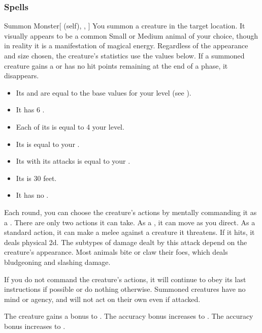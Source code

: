 \subsubsection{Spells}


\lowercase{\hypertarget{spell:Summon Monster}{}}\label{spell:Summon Monster}
\begin{attuneability}[Rank 1]{\hypertarget{spell:Summon Monster}{Summon Monster}}[ (self), , ]
You summon a creature in the target location.
It visually appears to be a common Small or Medium animal of your choice, though in reality it is a manifestation of magical energy.
Regardless of the appearance and size chosen, the creature's statistics use the values below.
If a summoned creature gains a  or has no hit points remaining at the end of a phase, it disappears.

\begin{itemize}
\item Its  and  are equal to the base values for your level (see ).
\item It has 6 .
\item Each of its  is equal to 4 \add your level.
\item Its  is equal to your  .
\item Its  with its attacks is equal to your .
\item Its  is 30 feet.
\item It has no .
\end{itemize}

Each round, you can choose the creature's actions by mentally commanding it as a .
There are only two actions it can take.
As a , it can move as you direct.
As a standard action, it can make a melee  against a creature it threatens.
If it hits, it deals physical  \minus2d.
The subtypes of damage dealt by this attack depend on the creature's appearance.
Most animals bite or claw their foes, which deals bludgeoning and slashing damage.

If you do not command the creature's actions, it will continue to obey its last instructions if possible or do nothing otherwise.
Summoned creatures have no mind or agency, and will not act on their own even if attacked.

\rankline
{} The creature gains a  bonus to .
 The accuracy bonus increases to .
 The accuracy bonus increases to .
\end{attuneability}
\vspace{0.25em}




